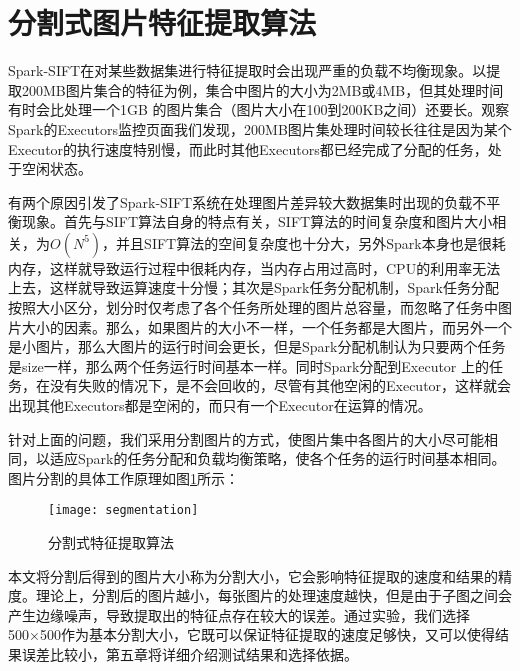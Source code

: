 \section{分割式图片特征提取算法}
Spark-SIFT在对某些数据集进行特征提取时会出现严重的负载不均衡现象。以提取200MB图片集合的特征为例，集合中图片的大小为2MB或4MB，但其处理时间有时会比处理一个1GB 的图片集合（图片大小在100到200KB之间）还要长。观察Spark的Executors监控页面我们发现，200MB图片集处理时间较长往往是因为某个Executor的执行速度特别慢，而此时其他Executors都已经完成了分配的任务，处于空闲状态。

有两个原因引发了Spark-SIFT系统在处理图片差异较大数据集时出现的负载不平衡现象。首先与SIFT算法自身的特点有关，SIFT算法的时间复杂度和图片大小相关，为$O(N^5)$，并且SIFT算法的空间复杂度也十分大，另外Spark本身也是很耗内存，这样就导致运行过程中很耗内存，当内存占用过高时，CPU的利用率无法上去，这样就导致运算速度十分慢；其次是Spark任务分配机制，Spark任务分配按照大小区分，划分时仅考虑了各个任务所处理的图片总容量，而忽略了任务中图片大小的因素。那么，如果图片的大小不一样，一个任务都是大图片，而另外一个是小图片，那么大图片的运行时间会更长，但是Spark分配机制认为只要两个任务是size一样，那么两个任务运行时间基本一样。同时Spark分配到Executor 上的任务，在没有失败的情况下，是不会回收的，尽管有其他空闲的Executor，这样就会出现其他Executors都是空闲的，而只有一个Executor在运算的情况。

针对上面的问题，我们采用分割图片的方式，使图片集中各图片的大小尽可能相同，以适应Spark的任务分配和负载均衡策略，使各个任务的运行时间基本相同。图片分割的具体工作原理如图\ref{fig:segmentation}所示：
\begin{figure}[htp]
\centering
\texttt{[image: segmentation]}
\caption{分割式特征提取算法}
\label{fig:segmentation}
\end{figure}

本文将分割后得到的图片大小称为分割大小，它会影响特征提取的速度和结果的精度。理论上，分割后的图片越小，每张图片的处理速度越快，但是由于子图之间会产生边缘噪声，导致提取出的特征点存在较大的误差。通过实验，我们选择500×500作为基本分割大小，它既可以保证特征提取的速度足够快，又可以使得结果误差比较小，第五章将详细介绍测试结果和选择依据。

